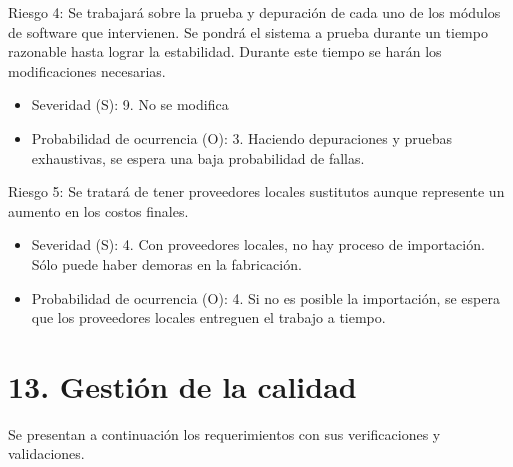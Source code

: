 \documentclass[11pt]{proyecto}
\begin{document}
Riesgo 4: Se trabajará sobre la prueba y depuración de cada uno de los módulos de software que intervienen. Se pondrá el sistema a prueba durante un tiempo razonable hasta lograr la estabilidad. Durante este tiempo se harán los modificaciones necesarias.
\begin{itemize}
\item Severidad (S): 9. No se modifica
\item Probabilidad de ocurrencia (O): 3. Haciendo depuraciones y pruebas exhaustivas, se espera una baja probabilidad de fallas.
\end{itemize}

Riesgo 5:  Se tratará de tener  proveedores locales sustitutos aunque represente un aumento en los costos finales. 
\begin{itemize}
\item Severidad (S): 4. Con proveedores locales, no hay proceso de importación. Sólo puede haber demoras en la fabricación.
\item Probabilidad de ocurrencia (O): 4. Si no es posible la importación, se espera que los proveedores locales entreguen el trabajo a tiempo.
\end{itemize}



\section{13. Gestión de la calidad}
\label{sec:calidad}


Se presentan a continuación los requerimientos con sus verificaciones y validaciones.
\end{document}
